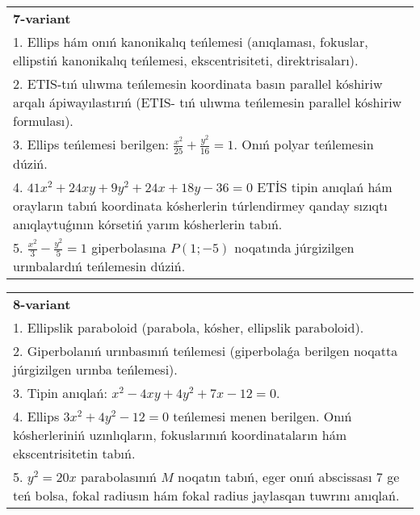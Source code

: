 \documentclass{article}
\begin{document}
\begin{tabular}{m{17cm}}
\textbf{7-variant}\\
1. Ellips hám onıń kanonikalıq teńlemesi (anıqlaması, fokuslar, ellipstiń kanonikalıq teńlemesi, ekscentrisiteti, direktrisaları).\\

2. ETIS-tıń ulıwma teńlemesin koordinata basın parallel kóshiriw arqalı ápiwayılastırıń (ETIS- tıń ulıwma teńlemesin parallel kóshiriw formulası).\\

3. Ellips teńlemesi berilgen: $\frac{x^2}{25}+\frac{y^2}{16}=1$. Onıń polyar teńlemesin dúziń.\\

4. $41x^{2} + 24xy + 9y^{2} + 24x + 18y - 36 = 0$ ETİS tipin anıqlań hám orayların tabıń koordinata kósherlerin túrlendirmey qanday sızıqtı anıqlaytuǵının kórsetiń yarım kósherlerin tabıń.  \\

5. $\frac{x^{2}}{3} - \frac{y^{2}}{5} = 1$ giperbolasına $P(1; - 5)$ noqatında júrgizilgen urınbalardıń teńlemesin dúziń.
\end{tabular}
\vspace{1cm}


\begin{tabular}{m{17cm}}
\textbf{8-variant}\\
1. Ellipslik paraboloid (parabola, kósher, ellipslik paraboloid).\\

2. Giperbolanıń urınbasınıń teńlemesi (giperbolaǵa berilgen noqatta júrgizilgen urınba teńlemesi).\\

3. Tipin anıqlań: $x^{2}-4 xy+4 y^{2}+7 x-12=0$.\\

4. Ellips $3x^{2} + 4y^{2} - 12 = 0$ teńlemesi menen berilgen. Onıń kósherleriniń uzınlıqların, fokuslarınıń koordinataların hám ekscentrisitetin tabıń.  \\

5. $y^{2} = 20x$ parabolasınıń $M$ noqatın tabıń, eger onıń abscissası 7 ge teń bolsa, fokal radiusın hám fokal radius jaylasqan tuwrını anıqlań.
\end{tabular}
\vspace{1cm}
\end{document}
